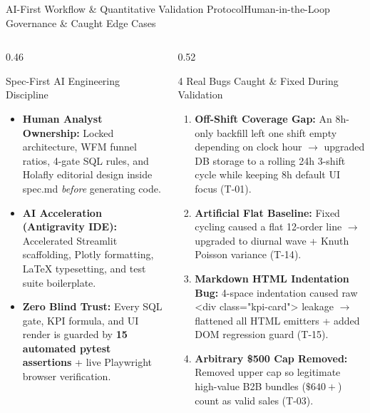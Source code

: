 \documentclass[aspectratio=169,8pt]{beamer}
\newcommand{\code}[1]{{\fontfamily{pcr}\selectfont\fontsize{6.5}{8.0}\selectfont\color{ink}#1}}
\begin{document}
\begin{frame}[t]{AI-First Workflow \& Quantitative Validation Protocol}{Human-in-the-Loop Governance \& Caught Edge Cases}
\vspace{2pt}
\begin{columns}[T,onlytextwidth]
  \begin{column}{0.46\textwidth}
    \begin{hfcard}{Spec-First AI Engineering Discipline}
      {\fontsize{6.8}{8.7}\selectfont
      \begin{itemize}\setlength\itemsep{3.5pt}
        \item \textbf{Human Analyst Ownership:} Locked architecture, WFM funnel ratios, 4-gate SQL rules, and Holafly editorial design inside \code{spec.md} \textit{before} generating code.
        \item \textbf{AI Acceleration (Antigravity IDE):} Accelerated Streamlit scaffolding, Plotly formatting, LaTeX typesetting, and test suite boilerplate.
        \item \textbf{Zero Blind Trust:} Every SQL gate, KPI formula, and UI render is guarded by \textbf{15 automated \code{pytest} assertions} + live Playwright browser verification.
      \end{itemize}
      }
    \end{hfcard}
  \end{column}

  \begin{column}{0.52\textwidth}
    \begin{neutralcard}{4 Real Bugs Caught \& Fixed During Validation}
      {\fontsize{6.6}{8.4}\selectfont
      \begin{enumerate}\setlength\itemsep{3pt}
        \item \textbf{Off-Shift Coverage Gap:} An 8h-only backfill left one shift empty depending on clock hour $\rightarrow$ upgraded DB storage to a rolling 24h 3-shift cycle while keeping 8h default UI focus (\code{T-01}).
        \item \textbf{Artificial Flat Baseline:} Fixed cycling caused a flat 12-order line $\rightarrow$ upgraded to diurnal wave + Knuth Poisson variance (\code{T-14}).
        \item \textbf{Markdown HTML Indentation Bug:} 4-space indentation caused raw \code{<div class="kpi-card">} leakage $\rightarrow$ flattened all HTML emitters + added DOM regression guard (\code{T-15}).
        \item \textbf{Arbitrary \$500 Cap Removed:} Removed upper cap so legitimate high-value B2B bundles ($\$640+$) count as valid sales (\code{T-03}).
      \end{enumerate}
      }
    \end{neutralcard}
  \end{column}
\end{columns}
\end{frame}
\end{document}
